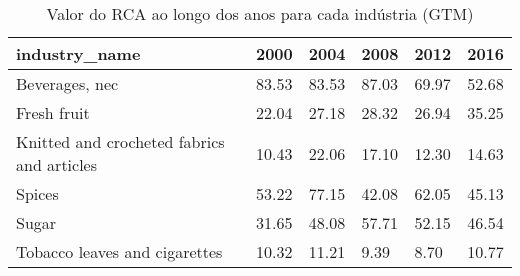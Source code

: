 \begin{table}
\centering
\caption{Valor do RCA ao longo dos anos para cada indústria (GTM)}
\begin{tabular}{p{6cm}p{1.5cm}p{1.5cm}p{1.5cm}p{1.5cm}p{1.5cm}}
\toprule
                             industry\_name &  2000 &  2004 &  2008 &  2012 &  2016 \\
\midrule
                            Beverages, nec & 83.53 & 83.53 & 87.03 & 69.97 & 52.68 \\
                               Fresh fruit & 22.04 & 27.18 & 28.32 & 26.94 & 35.25 \\
Knitted and crocheted fabrics and articles & 10.43 & 22.06 & 17.10 & 12.30 & 14.63 \\
                                    Spices & 53.22 & 77.15 & 42.08 & 62.05 & 45.13 \\
                                     Sugar & 31.65 & 48.08 & 57.71 & 52.15 & 46.54 \\
             Tobacco leaves and cigarettes & 10.32 & 11.21 &  9.39 &  8.70 & 10.77 \\
\bottomrule
\end{tabular}
\end{table}
